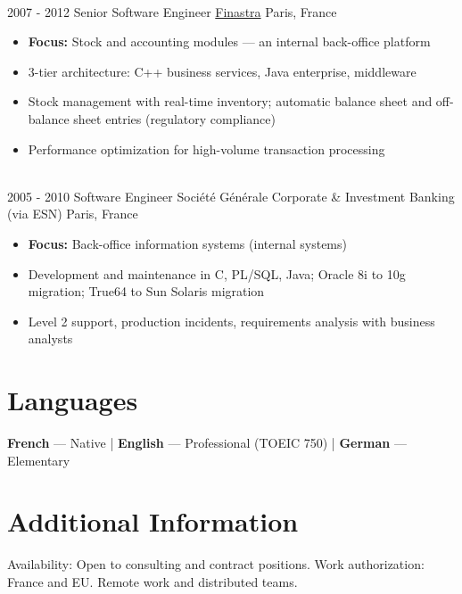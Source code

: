\documentclass[letterpaper]{twentysecondcv} %
\begin{document}
\begin{twentytimeline}
{\begin{itemize}
		\end{itemize}}
	\\
	\twentyitemtimeline{\faCode}
		{2007 -}
		{2012}
		{Senior Software Engineer}
		{\href{https://finastra.com}{Finastra}}
		{Paris, France}
		{\begin{itemize}
		\item \textbf{Focus:} Stock and accounting modules — an internal back-office platform
		\item 3-tier architecture: C++ business services, Java enterprise, middleware
		\item Stock management with real-time inventory; automatic balance sheet and off-balance sheet entries (regulatory compliance)
		\item Performance optimization for high-volume transaction processing
		\end{itemize}}
	\\
	\twentyitemtimeline{\faBriefcase}
		{2005 -}
		{2010}
		{Software Engineer}
		{Société Générale Corporate \& Investment Banking (via ESN)}
		{Paris, France}
		{\begin{itemize}
		\item \textbf{Focus:} Back-office information systems (internal systems)
		\item Development and maintenance in C, PL/SQL, Java; Oracle 8i to 10g migration; True64 to Sun Solaris migration
		\item Level 2 support, production incidents, requirements analysis with business analysts
		\end{itemize}}
\end{twentytimeline}


\section{Languages}

\textbf{French} — Native | \textbf{English} — Professional (TOEIC 750) | \textbf{German} — Elementary

\section{Additional Information}

Availability: Open to consulting and contract positions. Work authorization: France and EU. Remote work and distributed teams.

\end{document}
